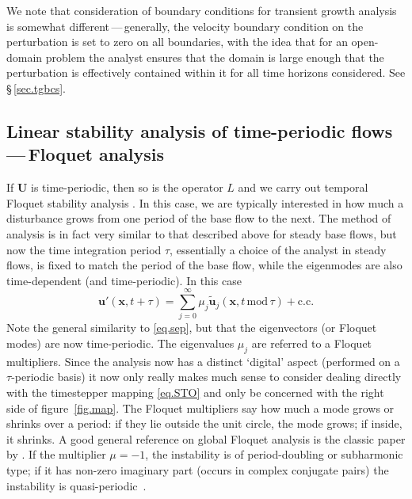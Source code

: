 \documentclass[11pt,a4paper]{report}
\newcommand\wt[1]{\widetilde{#1}}
\newcommand\qp{qua\-si-per\-io\-dic}
\newcommand\Ubase{{\bm{U}}}
\newcommand\upert{{\bm{u}'}}
\newcommand\xvec{\bm{x}}
\newcommand\Lop{{L}}
\begin{document}
We note that consideration of boundary conditions for transient growth
analysis is somewhat different\,---\,generally, the velocity boundary
condition on the perturbation is set to zero on all boundaries, with
the idea that for an open-domain problem the analyst ensures that the
domain is large enough that the perturbation is effectively contained
within it for all time horizons considered. See \S\,\ref{sec.tgbcs}.

\subsection{Linear stability analysis of time-periodic 
flows\,---\,Floquet analysis}
\label{sec.floquet}

If $\Ubase$ is time-periodic, then so is the operator $\Lop$ and we
carry out temporal Floquet stability analysis \citep[analysis of a
  linear system of ODE/PDE where the coefficients are time-periodic,
  see e.g.][]{iooss90}. In this case, we are typically interested in
how much a disturbance grows from one period of the base flow to the
next.  The method of analysis is in fact very similar to that
described above for steady base flows, but now the time integration
period $\tau$, essentially a choice of the analyst in steady flows, is
fixed to match the period of the base flow, while the eigenmodes are
also time-dependent (and time-periodic).  In this case
\begin{equation}
\upert(\xvec, t+\tau) = \sum_{j=0}^\infty
\mu_j\wt{\bm{u}}_j(\xvec,t\,\textrm{mod}\,\tau) +\text{c.c.}
\label{eq.flok}
\end{equation}
Note the general similarity to \eqref{eq.sep}, but that the
eigenvectors (or Floquet modes) are now time-periodic.  The
eigenvalues $\mu_j$ are referred to a Floquet multipliers.  Since the
analysis now has a distinct `digital' aspect (performed on a
$\tau$-periodic basis) it now only really makes much sense to consider
dealing directly with the timestepper mapping \eqref{eq.STO} and only
be concerned with the right side of figure~\ref{fig.map}.  The Floquet
multipliers say how much a mode grows or shrinks over a period: if
they lie outside the unit circle, the mode grows; if inside, it
shrinks.  A good general reference on global Floquet analysis is the
classic paper by \citet{bah96}.  If the multiplier $\mu=-1$, the
instability is of period-doubling or subharmonic type; if it has
non-zero imaginary part (occurs in complex conjugate pairs) the
instability is \qp\ \citep{bllo03b}.
\end{document}
